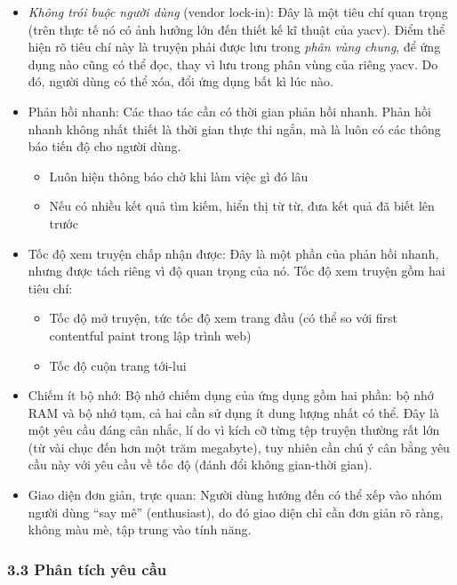 \documentclass[
]{article}
\providecommand{\tightlist}{%
  \setlength{\itemsep}{0pt}\setlength{\parskip}{0pt}}
\begin{document}
\begin{itemize}
\item
  \emph{Không trói buộc người dùng} (vendor lock-in): Đây là một tiêu
  chí quan trọng (trên thực tế nó có ảnh hưởng lớn đến thiết kế kĩ thuật
  của yacv). Điểm thể hiện rõ tiêu chí này là truyện phải được lưu trong
  \emph{phân vùng chung}, để ứng dụng nào cũng có thể đọc, thay vì lưu
  trong phân vùng của riêng yacv. Do đó, người dùng có thể xóa, đổi ứng
  dụng bất kì lúc nào.
\item
  Phản hồi nhanh: Các thao tác cần có thời gian phản hồi nhanh. Phản hồi
  nhanh không nhất thiết là thời gian thực thi ngắn, mà là luôn có các
  thông báo tiến độ cho người dùng.

  \begin{itemize}
  \tightlist
  \item
    Luôn hiện thông báo chờ khi làm việc gì đó lâu
  \item
    Nếu có nhiều kết quả tìm kiếm, hiển thị từ từ, đưa kết quả đã biết
    lên trước
  \end{itemize}
\item
  Tốc độ xem truyện chấp nhận được: Đây là một phần của phản hồi nhanh,
  nhưng được tách riêng vì độ quan trọng của nó. Tốc độ xem truyện gồm
  hai tiêu chí:

  \begin{itemize}
  \tightlist
  \item
    Tốc độ mở truyện, tức tốc độ xem trang đầu (có thể so với first
    contentful paint trong lập trình web)
  \item
    Tốc độ cuộn trang tới-lui
  \end{itemize}
\item
  Chiếm ít bộ nhớ: Bộ nhớ chiếm dụng của ứng dụng gồm hai phần: bộ nhớ
  RAM và bộ nhớ tạm, cả hai cần sử dụng ít dung lượng nhất có thể. Đây
  là một yêu cầu đáng cân nhắc, lí do vì kích cỡ từng tệp truyện thường
  rất lớn (từ vài chục đến hơn một trăm megabyte), tuy nhiên cần chú ý
  cân bằng yêu cầu này với yêu cầu về tốc độ (đánh đổi không gian-thời
  gian).
\item
  Giao diện đơn giản, trực quan: Người dùng hướng đến có thể xếp vào
  nhóm người dùng ``say mê'' (enthusiast), do đó giao diện chỉ cần đơn
  giản rõ ràng, không màu mè, tập trung vào tính năng.
\end{itemize}

\hypertarget{phuxe2n-tuxedch-yuxeau-cux1ea7u}{%
\subsubsection{\texorpdfstring{3.3 Phân tích yêu cầu
}{3.3 Phân tích yêu cầu }}\label{phuxe2n-tuxedch-yuxeau-cux1ea7u}}
\end{document}

